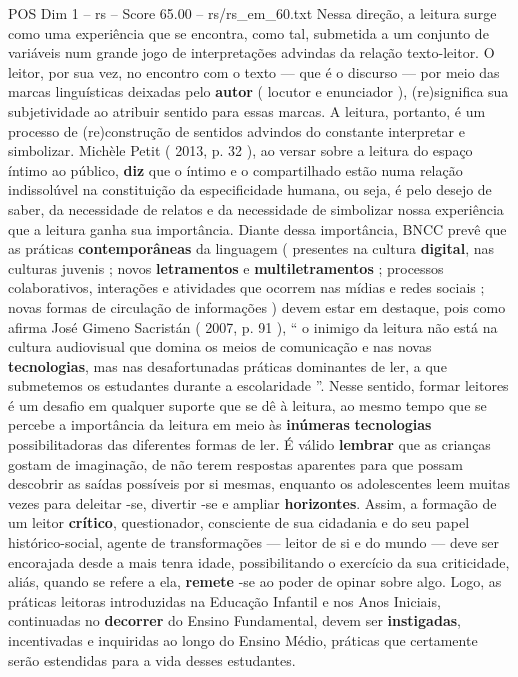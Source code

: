 \begin{textsample}{POS Dim 1 – rs – Score 65.00 – rs/rs\_em\_60.txt}
Nessa direção, a leitura surge como uma experiência que se encontra, como tal, submetida a um conjunto de variáveis num grande jogo de interpretações advindas da relação texto-leitor.
O leitor, por sua vez, no encontro com o texto — que é o discurso — por meio das marcas linguísticas deixadas pelo \textbf{autor} ( locutor e enunciador ), (re)significa sua subjetividade ao atribuir sentido para essas marcas.
A leitura, portanto, é um processo de (re)construção de sentidos advindos do constante interpretar e simbolizar.
Michèle Petit ( 2013, p. 32 ), ao versar sobre a leitura do espaço íntimo ao público, \textbf{diz} que o íntimo e o compartilhado estão numa relação indissolúvel na constituição da especificidade humana, ou seja, é pelo desejo de saber, da necessidade de relatos e da necessidade de simbolizar nossa experiência que a leitura ganha sua importância.
Diante dessa importância, BNCC prevê que as práticas \textbf{contemporâneas} da linguagem ( presentes na cultura \textbf{digital}, nas culturas juvenis ; novos \textbf{letramentos} e \textbf{multiletramentos} ; processos colaborativos, interações e atividades que ocorrem nas mídias e redes sociais ; novas formas de circulação de informações ) devem estar em destaque, pois como afirma José Gimeno Sacristán ( 2007, p. 91 ), “ o inimigo da leitura não está na cultura audiovisual que domina os meios de comunicação e nas novas \textbf{tecnologias}, mas nas desafortunadas práticas dominantes de ler, a que submetemos os estudantes durante a escolaridade ”.
Nesse sentido, formar leitores é um desafio em qualquer suporte que se dê à leitura, ao mesmo tempo que se percebe a importância da leitura em meio às \textbf{inúmeras} \textbf{tecnologias} possibilitadoras das diferentes formas de ler.
É válido \textbf{lembrar} que as crianças gostam de imaginação, de não terem respostas aparentes para que possam descobrir as saídas possíveis por si mesmas, enquanto os adolescentes leem muitas vezes para deleitar -se, divertir -se e ampliar \textbf{horizontes}.
Assim, a formação de um leitor \textbf{crítico}, questionador, consciente de sua cidadania e do seu papel histórico-social, agente de transformações — leitor de si e do mundo — deve ser encorajada desde a mais tenra idade, possibilitando o exercício da sua criticidade, aliás, quando se refere a ela, \textbf{remete} -se ao poder de opinar sobre algo.
Logo, as práticas leitoras introduzidas na Educação Infantil e nos Anos Iniciais, continuadas no \textbf{decorrer} do Ensino Fundamental, devem ser \textbf{instigadas}, incentivadas e inquiridas ao longo do Ensino Médio, práticas que certamente serão estendidas para a vida desses estudantes.

\end{textsample}
